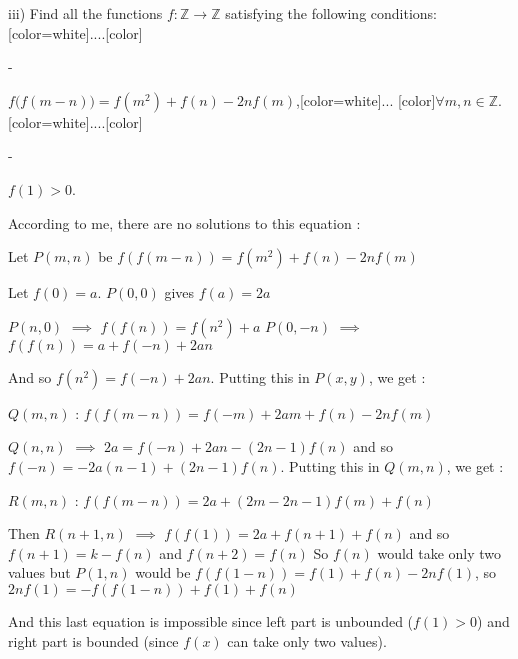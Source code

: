 \begin{solution}
	\begin{tcolorbox} iii) Find all the functions $ f : \mathbb{Z} \to \mathbb{Z}$ satisfying the following conditions:
[color=white]....[\/color]\begin{bolded}-\end{bolded} $ f \big( f (m - n)\big) = f (m^2) + f (n) - 2n f (m)$,[color=white]... [\/color]$ \forall m, n \in \mathbb{Z}$.
[color=white]....[\/color]\begin{bolded}-\end{bolded} $ f (1) > 0$.\end{tcolorbox}

According to me, there are no solutions to this equation :

Let $ P(m,n)$ be $ f(f(m-n))=f(m^2)+f(n)-2nf(m)$

Let $ f(0)=a$. $ P(0,0)$ gives $ f(a)=2a$

$ P(n,0)$ $ \implies$ $ f(f(n))=f(n^2)+a$ 
$ P(0,-n)$ $ \implies$ $ f(f(n))=a+f(-n)+2an$

And so $ f(n^2)=f(-n)+2an$. Putting this in $ P(x,y)$, we get :

$ Q(m,n)$ : $ f(f(m-n))=f(-m)+2am+f(n)-2nf(m)$

$ Q(n,n)$ $ \implies$ $ 2a=f(-n)+2an-(2n-1)f(n)$ and so $ f(-n)=-2a(n-1)+(2n-1)f(n)$. Putting this in $ Q(m,n)$, we get :

$ R(m,n)$ : $ f(f(m-n))=2a+(2m-2n-1)f(m)+f(n)$

Then $ R(n+1,n)$ $ \implies$ $ f(f(1))=2a+f(n+1)+f(n)$ and so $ f(n+1)=k-f(n)$ and $ f(n+2)=f(n)$
So $ f(n)$ would take only two values but $ P(1,n)$ would be $ f(f(1-n))=f(1)+f(n)-2nf(1)$, so $ 2nf(1)=-f(f(1-n))+f(1)+f(n)$

And this last equation is impossible since left part is unbounded ($ f(1)>0$) and right part is bounded (since $ f(x)$ can take only two values).
\end{solution}



